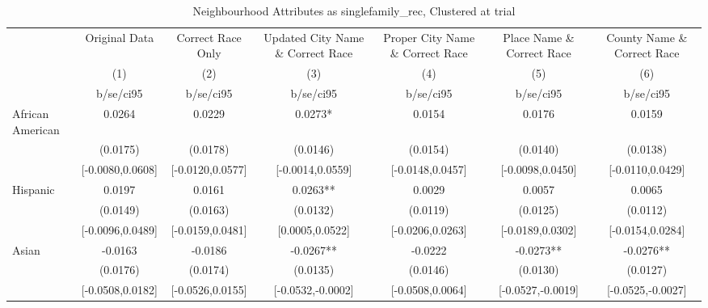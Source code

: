 \documentclass{article}
\begin{document}
\begin{table}[htbp]\centering
\def\sym#1{\ifmmode^{#1}\else\(^{#1}\)\fi}
\caption{Neighbourhood Attributes as singlefamily\_rec, Clustered at trial}
\begin{tabular}{l*{6}{c}}
\toprule
                    &\multicolumn{1}{c}{Original Data}&\multicolumn{1}{c}{Correct Race Only}&\multicolumn{1}{c}{Updated City Name \& Correct Race}&\multicolumn{1}{c}{Proper City Name \& Correct Race}&\multicolumn{1}{c}{Place Name \& Correct Race}&\multicolumn{1}{c}{County Name \& Correct Race}\\\cmidrule(lr){2-2}\cmidrule(lr){3-3}\cmidrule(lr){4-4}\cmidrule(lr){5-5}\cmidrule(lr){6-6}\cmidrule(lr){7-7}
                    &\multicolumn{1}{c}{(1)}   &\multicolumn{1}{c}{(2)}   &\multicolumn{1}{c}{(3)}   &\multicolumn{1}{c}{(4)}   &\multicolumn{1}{c}{(5)}   &\multicolumn{1}{c}{(6)}   \\
                    &   b/se/ci95   &   b/se/ci95   &   b/se/ci95   &   b/se/ci95   &   b/se/ci95   &   b/se/ci95   \\
\midrule
African American    &      0.0264   &      0.0229   &      0.0273*  &      0.0154   &      0.0176   &      0.0159   \\
                    &    (0.0175)   &    (0.0178)   &    (0.0146)   &    (0.0154)   &    (0.0140)   &    (0.0138)   \\
                    &[-0.0080,0.0608]   &[-0.0120,0.0577]   &[-0.0014,0.0559]   &[-0.0148,0.0457]   &[-0.0098,0.0450]   &[-0.0110,0.0429]   \\
Hispanic            &      0.0197   &      0.0161   &      0.0263** &      0.0029   &      0.0057   &      0.0065   \\
                    &    (0.0149)   &    (0.0163)   &    (0.0132)   &    (0.0119)   &    (0.0125)   &    (0.0112)   \\
                    &[-0.0096,0.0489]   &[-0.0159,0.0481]   &[0.0005,0.0522]   &[-0.0206,0.0263]   &[-0.0189,0.0302]   &[-0.0154,0.0284]   \\
Asian               &     -0.0163   &     -0.0186   &     -0.0267** &     -0.0222   &     -0.0273** &     -0.0276** \\
                    &    (0.0176)   &    (0.0174)   &    (0.0135)   &    (0.0146)   &    (0.0130)   &    (0.0127)   \\
                    &[-0.0508,0.0182]   &[-0.0526,0.0155]   &[-0.0532,-0.0002]   &[-0.0508,0.0064]   &[-0.0527,-0.0019]   &[-0.0525,-0.0027]   \\

\end{tabular}
\end{table}
\end{document}

